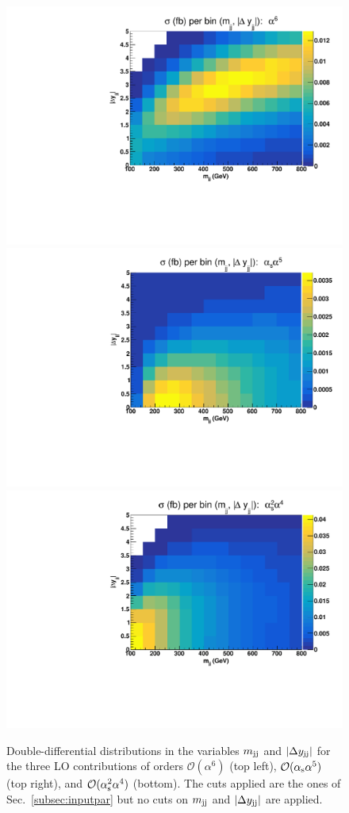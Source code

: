 \begin{figure}[hbt]
\centering
\includegraphics[scale=0.395]{figures/scanfigures/scan_ew6.pdf}
\includegraphics[scale=0.395]{figures/scanfigures/scan_ew5qcd1.pdf}
\includegraphics[scale=0.395]{figures/scanfigures/scan_ew4qcd2.pdf}
\caption{Double-differential distributions in the variables $m_{\text{j}\text{j}}$ and $|\Delta y_{\text{j}\text{j}}|$ for the three LO contributions of orders $\mathcal{O}(\alpha^6)$ (top left), $\mathcal{O}(\alpha_\text{s}\alpha^5)$ (top right), and $\mathcal{O}(\alpha_\text{s}^2 \alpha^4)$ (bottom).
The cuts applied are the ones of Sec.~\ref{subsec:inputpar} but no cuts on $m_{\text{j}\text{j}}$ and $|\Delta y_{\text{j}\text{j}}|$ are applied.
}
\label{fig:mjjdyjj_2d_LO}
\end{figure}
